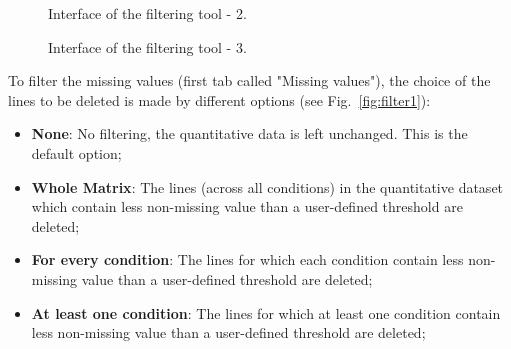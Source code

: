 \documentclass[12pt]{article}
\begin{document}
\begin {figure}
\centering
{}
\caption{Interface of the filtering tool - 2.}\label{fig:filter2}
\end {figure}

\begin {figure}
\centering
{}
\caption{Interface of the filtering tool - 3.}\label{fig:filter3}
\end {figure}

To filter the missing values (first tab called "Missing values"), the choice 
of the lines to be deleted is made by different options (see 
Fig.~\ref{fig:filter1}):
\begin {itemize}
\item\textbf{None}: No filtering, the quantitative data is left unchanged. 
This is the default option;
\item\textbf{Whole Matrix}: The lines (across all conditions) in the 
quantitative dataset which contain less non-missing value than a 
user-defined threshold are deleted;
\item\textbf{For every condition}: The lines for which each condition 
contain less non-missing value than a user-defined threshold are deleted;
\item\textbf{At least one condition}: The lines for which at least one 
condition contain less non-missing value than a user-defined threshold 
are deleted;
\end {itemize}
\end{document}
